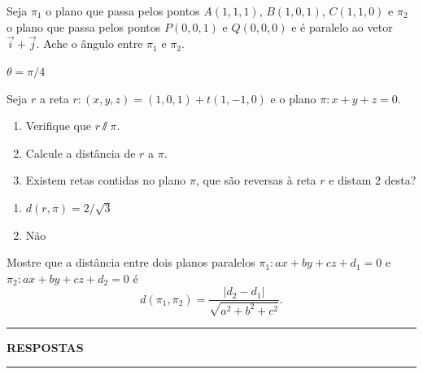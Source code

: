 \documentclass[12pt]{exam}
\begin{document}
\begin{exercicio}
    Seja $\pi_1$ o plano que passa pelos pontos $A(1,1,1)$, $B(1,0,1)$, $C(1,1,0)$ e $\pi_2$ o plano que passa pelos pontos $P(0,0,1)$ e $Q(0,0,0)$ e é paralelo ao vetor $\vec{i} + \vec{j}$. Ache o ângulo entre $\pi_1$ e $\pi_2$.
    \begin{solucao}
        $\theta = \pi/4$
    \end{solucao}
\end{exercicio}

\begin{exercicio}
    Seja $r$ a reta $r : (x,y,z) = (1,0,1) + t(1,-1,0)$ e o plano $\pi : x + y + z = 0$.
    \begin{enumerate}[label=({\alph*})]
        \item Verifique que $r \varparallel \pi$.
        \item Calcule a distância de $r$ a $\pi$.
        \item Existem retas contidas no plano $\pi$, que são reversas à reta $r$ e distam 2 desta?
    \end{enumerate}
    \begin{solucao}
        \begin{enumerate}
            \item[(b)] $d(r,\pi) = 2/\sqrt{3}$
            \item[(c)] Não
        \end{enumerate}
    \end{solucao}
\end{exercicio}

\begin{exercicio}
    Mostre que a distância entre dois planos paralelos $\pi_1 : ax + by + cz + d_1 = 0$ e $\pi_2 : ax + by + cz + d_2 = 0$ é
    \[
        d(\pi_1,\pi_2) = \dfrac{|d_2 - d_1|}{\sqrt{a^2 + b^2 + c^2}}.
    \]
\end{exercicio}

\newpage
{}
\hrule
\begin{center}
    {\large\bf RESPOSTAS}
\end{center}
\hrule

\end{document}
